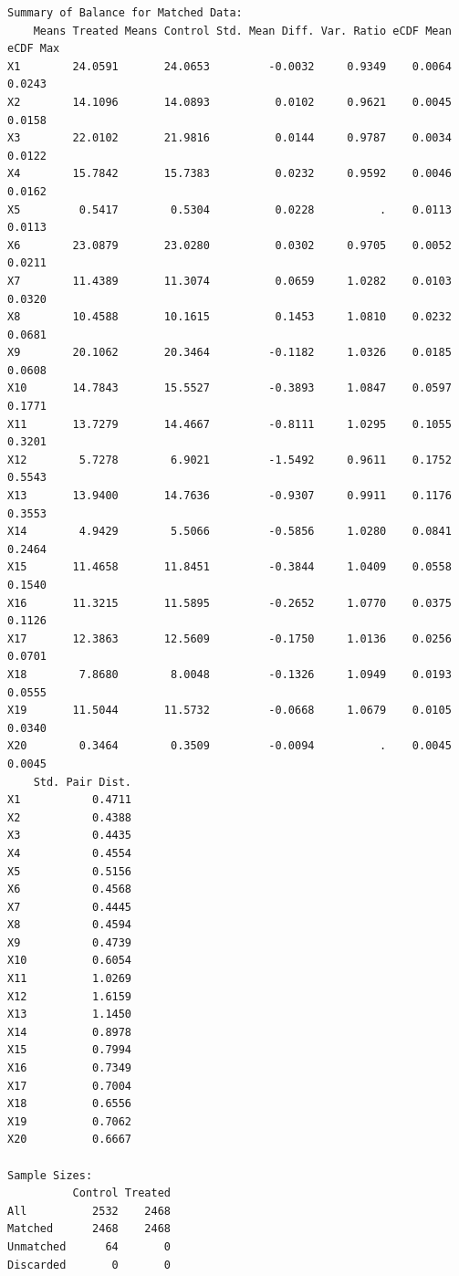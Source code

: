 \documentclass[
  letterpaper,
  DIV=11,
  numbers=noendperiod]{scrartcl}
\begin{document}
\begin{verbatim}
Summary of Balance for Matched Data:
    Means Treated Means Control Std. Mean Diff. Var. Ratio eCDF Mean eCDF Max
X1        24.0591       24.0653         -0.0032     0.9349    0.0064   0.0243
X2        14.1096       14.0893          0.0102     0.9621    0.0045   0.0158
X3        22.0102       21.9816          0.0144     0.9787    0.0034   0.0122
X4        15.7842       15.7383          0.0232     0.9592    0.0046   0.0162
X5         0.5417        0.5304          0.0228          .    0.0113   0.0113
X6        23.0879       23.0280          0.0302     0.9705    0.0052   0.0211
X7        11.4389       11.3074          0.0659     1.0282    0.0103   0.0320
X8        10.4588       10.1615          0.1453     1.0810    0.0232   0.0681
X9        20.1062       20.3464         -0.1182     1.0326    0.0185   0.0608
X10       14.7843       15.5527         -0.3893     1.0847    0.0597   0.1771
X11       13.7279       14.4667         -0.8111     1.0295    0.1055   0.3201
X12        5.7278        6.9021         -1.5492     0.9611    0.1752   0.5543
X13       13.9400       14.7636         -0.9307     0.9911    0.1176   0.3553
X14        4.9429        5.5066         -0.5856     1.0280    0.0841   0.2464
X15       11.4658       11.8451         -0.3844     1.0409    0.0558   0.1540
X16       11.3215       11.5895         -0.2652     1.0770    0.0375   0.1126
X17       12.3863       12.5609         -0.1750     1.0136    0.0256   0.0701
X18        7.8680        8.0048         -0.1326     1.0949    0.0193   0.0555
X19       11.5044       11.5732         -0.0668     1.0679    0.0105   0.0340
X20        0.3464        0.3509         -0.0094          .    0.0045   0.0045
    Std. Pair Dist.
X1           0.4711
X2           0.4388
X3           0.4435
X4           0.4554
X5           0.5156
X6           0.4568
X7           0.4445
X8           0.4594
X9           0.4739
X10          0.6054
X11          1.0269
X12          1.6159
X13          1.1450
X14          0.8978
X15          0.7994
X16          0.7349
X17          0.7004
X18          0.6556
X19          0.7062
X20          0.6667

Sample Sizes:
          Control Treated
All          2532    2468
Matched      2468    2468
Unmatched      64       0
Discarded       0       0
\end{verbatim}
\end{document}
